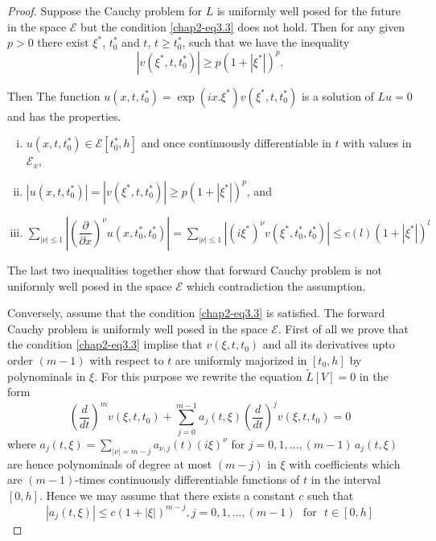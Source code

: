 \begin{proof}
Suppose the Cauchy problem for $L$ is uniformly well posed for the
future in the space $\mathscr{E}$ but the condition \eqref{chap2-eq3.3} does not
hold. Then for any given $p>0$ there exist $\xi^*$, $t^*_0$ and $t$,
$t\geq t^*_0$,  such that we have the inequality 
$$
|v (\xi^*,  t, t^*_0 ) | \geq p(1+ | \xi^* |)^p.
$$

Then  The function $u(x, t, t^*_0) = \exp (ix. \xi^*) v (\xi^*, t,
t_0^*)$ is a solution of $Lu=0$ and has the properties. 
\begin{enumerate}[(i)]
\item $u(x, t, t^*_0) \in \mathscr{E} [t_0^*, h]$ and once
  continuously differentiable in $t$ with values in $\mathscr{E}_x$,  

\item $|u (x, t, t^*_0) | = | v (\xi^* ,  t,  t^*_0)| \geq p
  (1+|\xi^*|)^p$, and\pageoriginale 

\item $\sum\limits_{|\nu| \leq 1}\left| \left(\dfrac{\partial}{\partial
  x}\right)^\nu u (x, t^*_0,  t^*_0) \right| = \sum\limits_{|\nu|\leq 1}
  \left| 
  (i \xi^*)^\nu v (\xi^*,  t^*_0,  t^*_0) \right |  \leq c(l)
  (1+|\xi^*|)^l$ 
\end{enumerate}

The last two inequalities together show that forward Cauchy problem is
not uniformly well posed in the space $\mathscr{E}$ which
contradiction the assumption.  

Conversely,  assume that the condition \eqref{chap2-eq3.3} is
satisfied. The forward Cauchy problem is uniformly well posed in 
the space $\mathscr{E}$. First of all we prove that the
condition \eqref{chap2-eq3.3} implise that $v (\xi, t, t_0)$ and all
its derivatives 
upto order $(m-1)$ with respect to $t$ are uniformly majorized in
$[t_0, h]$ by polynominals in $\xi$. For this purpose we rewrite the
equation $\tilde{L}[V] =0$ in the form  
\begin{equation}
(\frac{d}{dt})^m v (\xi, t, t_0) + \sum\limits^{m-1}_{j=0} a_j (t,
  \xi ) (\frac{d}{dt})^j v(\xi, t, t_0) = 0 \tag{3.4}\label{chap2-eq3.4}     
\end{equation}
where $a_j(t,\xi)= \sum\limits_{| \nu | = m-j} a_{\nu,  j} (t)
(i\xi)^\nu $ for $j=0, 1, \ldots, (m-1)\, a_j (t, \xi)$ are hence
polynominals of degree at most $(m-j)$ in $\xi$ with coefficients
which are $(m-1)$-times continuously differentiable functions of $t$ in
the interval $[0, h]$. Hence we may assume that there exists a
constant $c$ such that 
\begin{equation*}
|a_j (t,  \xi ) | \leq c (1+|\xi | )^{m-j},  j=0, 1, \ldots , (m-1)
\text{~ for~ } t \in [0, h] \tag{3.5}\label{chap2-eq3.5}     
\end{equation*}


\end{proof}
